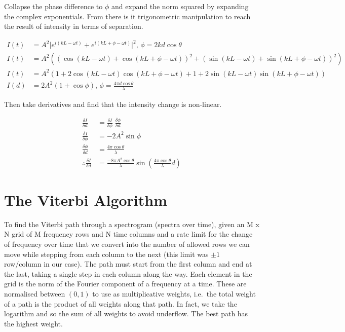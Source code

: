 \documentclass[prb,preprint]{revtex4-1}
\begin{document}
Collapse the phase difference to $\phi$ and expand the norm squared by expanding the complex exponentials. From there is it trigonometric manipulation to reach the result of intensity in terms of separation.

\begin{align}    
    I(t) &= A^2 \lvert e^{i (k L - \omega t)} + e^{i (k L + \phi - \omega t)} \rvert^2,\, \phi = 2 k d \cos{\theta} \\
    I(t) &= A^2 ((\cos{(k L - \omega t)} + \cos{(k L + \phi - \omega t)})^2 + (\sin{(k L - \omega t)} + \sin{(k L + \phi - \omega t)})^2) \\
    I(t) &= A^2 (1 + 2 \cos{(k L - \omega t)} \cos{(k L + \phi - \omega t)} + 1 + 2 \sin{(k L - \omega t)} \sin{(k L + \phi - \omega t)}) \\
    I(d) &= 2 A^2 (1 + \cos{\phi}),\, \phi = \frac{4 \pi d \cos{\theta}}{\lambda}
\end{align}

Then take derivatives and find that the intensity change is non-linear.

\begin{align}    
    \frac{\delta I}{\delta d} &= \frac{\delta I}{\delta \phi}\; \frac{\delta \phi}{\delta d}\\
    \frac{\delta I}{\delta\phi} &= - 2 A^2 \sin{\phi}\\
    \frac{\delta\phi}{\delta d} &= \frac{4 \pi \cos{\theta}}{\lambda}\\
    \therefore \frac{\delta I}{\delta d} &= \frac{- 8 \pi A^2 \cos{\theta}}{\lambda} \sin{(\frac{4 \pi \cos{\theta}}{\lambda} d)}
\end{align}

\section{The Viterbi Algorithm}
\label{app:viterbi}

To find the Viterbi path through a spectrogram (spectra over time), given an M x N grid of M frequency rows and N time columns and a rate limit for the change of frequency over time that we convert into the number of allowed rows we can move while stepping from each column to the next (this limit was $\pm 1$ row/column in our case). The path must start from the first column and end at the last, taking a single step in each column along the way. Each element in the grid is the norm of the Fourier component of a frequency at a time. These are normalised between $(0, 1)$ to use as multiplicative weights, i.e.\ the total weight of a path is the product of all weights along that path. In fact, we take the logarithm and so the sum of all weights to avoid underflow. The best path has the highest weight.
\end{document}
